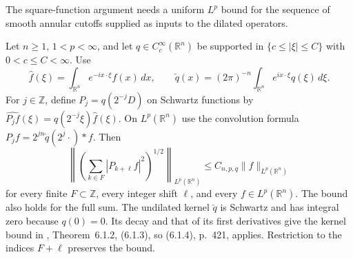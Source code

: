 The square-function argument needs a uniform $L^p$ bound for the sequence of smooth annular cutoffs supplied as inputs to the dilated operators.

\begin{Proposition}\label{ext:stein-annular-square}
Let $n\ge1$, $1<p<\infty$, and let $q\in C_c^\infty(\mathbb R^n)$ be supported in $\{c\le|\xi|\le C\}$ with $0<c\le C<\infty$. Use
\[
 \widehat f(\xi)=\int_{\mathbb R^n}e^{-ix\cdot\xi}f(x)\,dx,\qquad
 \check q(x)=(2\pi)^{-n}\int_{\mathbb R^n}e^{ix\cdot\xi}q(\xi)\,d\xi .
\]
For $j\in\mathbb Z$, define $P_j=q(2^{-j}D)$ on Schwartz functions by
$\widehat{P_j f}(\xi)=q(2^{-j}\xi)\widehat f(\xi)$. On $L^p(\mathbb R^n)$ use the convolution formula $P_j f=2^{jn}\check q(2^j\cdot)*f$. Then
\[
 \left\|\left(\sum_{k\in F}|P_{k+\ell} f|^2\right)^{1/2}\right\|_{L^p(\mathbb R^n)}
 \le C_{n,p,q}\|f\|_{L^p(\mathbb R^n)}
\]
for every finite $F\subset\mathbb Z$, every integer shift $\ell$, and every $f\in L^p(\mathbb R^n)$. The bound also holds for the full sum. The undilated kernel $\check q$ is Schwartz and has integral zero because $q(0)=0$. Its decay and that of its first derivatives give the kernel bound in \cite{r-32}, Theorem~6.1.2, (6.1.3), so (6.1.4), p.~421, applies. Restriction to the indices $F+\ell$ preserves the bound.
\end{Proposition}
